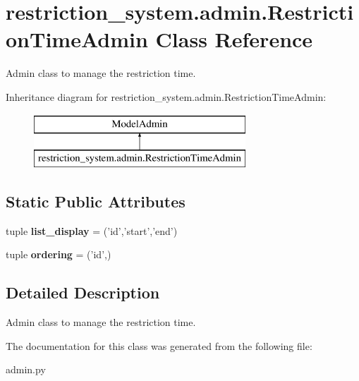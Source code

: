 \hypertarget{classrestriction__system_1_1admin_1_1RestrictionTimeAdmin}{}\section{restriction\+\_\+system.\+admin.\+Restriction\+Time\+Admin Class Reference}
\label{classrestriction__system_1_1admin_1_1RestrictionTimeAdmin}


Admin class to manage the restriction time.  


Inheritance diagram for restriction\+\_\+system.\+admin.\+Restriction\+Time\+Admin\+:\begin{figure}[H]
\begin{center}
\leavevmode
\includegraphics[height=2.000000cm]{classrestriction__system_1_1admin_1_1RestrictionTimeAdmin}
\end{center}
\end{figure}
\subsection*{Static Public Attributes}
\begin{DoxyCompactItemize}
\item 
\hypertarget{classrestriction__system_1_1admin_1_1RestrictionTimeAdmin_a696c7e2d47004743b0bf1ca67512e020}{}tuple {\bfseries list\+\_\+display} = ('id','start','end')\label{classrestriction__system_1_1admin_1_1RestrictionTimeAdmin_a696c7e2d47004743b0bf1ca67512e020}

\item 
\hypertarget{classrestriction__system_1_1admin_1_1RestrictionTimeAdmin_a3bd77ac38b41d9d9f8a5cd3132328b73}{}tuple {\bfseries ordering} = ('id',)\label{classrestriction__system_1_1admin_1_1RestrictionTimeAdmin_a3bd77ac38b41d9d9f8a5cd3132328b73}

\end{DoxyCompactItemize}


\subsection{Detailed Description}
Admin class to manage the restriction time. 



The documentation for this class was generated from the following file\+:\begin{DoxyCompactItemize}
\item 
admin.\+py\end{DoxyCompactItemize}
